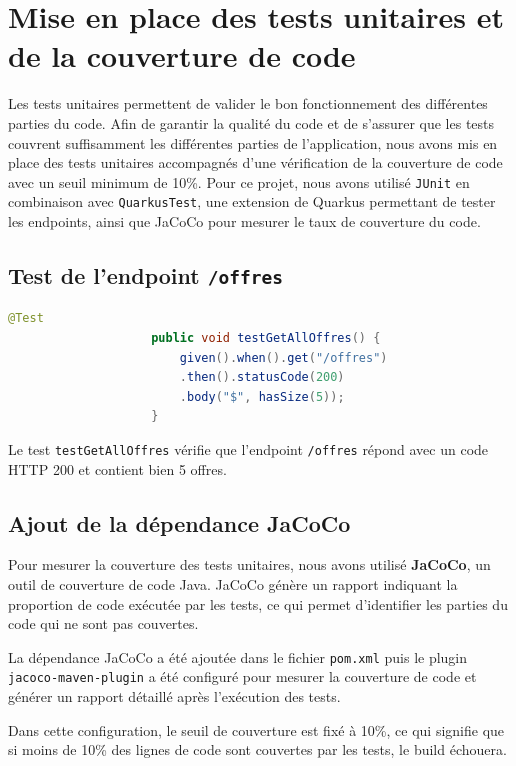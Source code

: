 \documentclass[11pt]{article}
\begin{document}
		\section{Mise en place des tests unitaires et de la couverture de code}
		\label{subsec:test-offres}
		Les tests unitaires permettent de valider le bon fonctionnement des différentes parties du code.
		Afin de garantir la qualité du code et de s'assurer que les tests couvrent suffisamment les différentes parties de l'application, nous avons mis en place des tests unitaires accompagnés d'une vérification de la couverture de code avec un seuil minimum de 10\%. 
		Pour ce projet, nous avons utilisé \texttt{JUnit} en combinaison avec \texttt{QuarkusTest}, une extension de Quarkus permettant de tester les endpoints, ainsi que JaCoCo pour mesurer le taux de couverture du code. 
		
		\subsection{Test de l'endpoint \texttt{/offres}}
		
	
			\begin{lstlisting}[language=Java]
					@Test
					public void testGetAllOffres() {
						given().when().get("/offres")
						.then().statusCode(200)
						.body("$", hasSize(5));
					}
			\end{lstlisting}
				Le test \texttt{testGetAllOffres} vérifie que l'endpoint \texttt{/offres} répond avec un code HTTP 200 et contient bien 5 offres.
	
		
		\subsection{Ajout de la dépendance JaCoCo}
		Pour mesurer la couverture des tests unitaires, nous avons utilisé \textbf{JaCoCo}, un outil de couverture de code Java. JaCoCo génère un rapport indiquant la proportion de code exécutée par les tests, ce qui permet d'identifier les parties du code qui ne sont pas couvertes.
		
		La dépendance JaCoCo a été ajoutée dans le fichier \texttt{pom.xml} puis le plugin \texttt{jacoco-maven-plugin} a été configuré pour mesurer la couverture de code et générer un rapport détaillé après l'exécution des tests.
		
		Dans cette configuration, le seuil de couverture est fixé à 10\%, ce qui signifie que si moins de 10\% des lignes de code sont couvertes par les tests, le build échouera.
		
\end{document}
